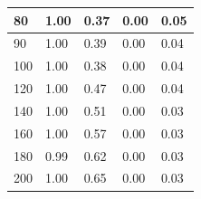 \documentclass[10pt]{report}
\begin{document}
\begin{figure}[H]
\begin{minipage}[b]{0.5\textwidth}
\begin{flushright}
\begin{tabular}{|l|l|l|l|l|}
    80 & 1.00 & 0.37 & 0.00 & 0.05 \\ \hline
  	90 & 1.00 & 0.39 & 0.00 & 0.04 \\ \hline
  	100 & 1.00 & 0.38 & 0.00 & 0.04 \\ \hline
  	120 & 1.00 & 0.47 & 0.00 & 0.04 \\ \hline
  	140 & 1.00 & 0.51 & 0.00 & 0.03 \\ \hline
  	160 & 1.00 & 0.57 & 0.00 & 0.03 \\ \hline
  	180 & 0.99 & 0.62 & 0.00 & 0.03 \\ \hline
  	200 & 1.00 & 0.65 & 0.00 & 0.03 \\ \hline
\end{tabular}
\end{flushright}\end{minipage}
\end{figure}
\end{document}
